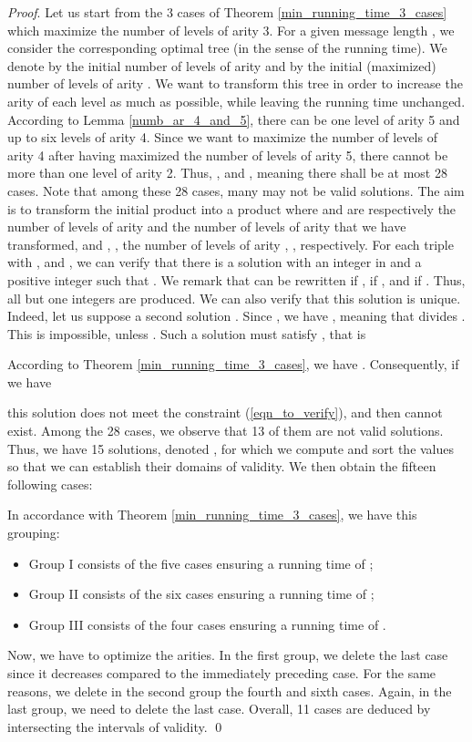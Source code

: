 \documentclass{llncs}
\renewenvironment{proof}{\paragraph{Proof} }{\hfill\qed}
\renewcommand{\paragraph}[1]{\noindent\textit{#1}.}
\begin{document}
\begin{proof}
Let us start from the 3 cases of Theorem \ref{min_running_time_3_cases} which maximize the number of levels of arity 3. 
For a given message length , we consider the corresponding optimal tree (in the sense of the running time). 
We denote by  the initial number of levels of arity  and by  the initial (maximized) number of levels of arity . 
We want to transform this tree in order to increase the arity of each level as much as possible, while leaving the running time unchanged.
According to Lemma \ref{numb_ar_4_and_5}, there can be one level of arity 5 and up to six levels of arity 4.
Since we want to maximize the number of levels of arity 4 after having maximized the number of levels of arity 5, 
there cannot be more than one level of arity 2. Thus, ,  
and , meaning there shall be at most 28 cases.
Note that among these 28 cases, many may not be valid solutions.
The aim is to transform the initial product  into
a product  where  and  are respectively the number of levels of arity  and the number of levels of arity  
that we have transformed, and , ,  the number of levels of arity ,
,  respectively.
For each triple  with ,  
and , we can verify that there is a solution  with  an integer in 
and  a positive integer such that . We remark that  can be rewritten  if ,  if , and  if . 
Thus, all but one integers are produced.
We can also verify that this solution is unique. Indeed, let us suppose a second solution . Since , we have
, meaning that  divides . This is impossible, unless . Such a solution must satisfy  , 
that is

According to Theorem \ref{min_running_time_3_cases}, we have . Consequently, if we have 


this solution does not meet the constraint (\ref{eqn_to_verify}), and then cannot exist. Among the 28 cases, we observe that 13 of them are not valid solutions.
Thus, we have 15 solutions, denoted , for which we compute and sort the values  so that we can establish
their domains of validity. We then obtain the fifteen following cases:



In accordance with Theorem \ref{min_running_time_3_cases}, we have this grouping: 
\begin{itemize}
 \item Group I consists of the five cases ensuring a running time of ;
 \item Group II consists of the six cases ensuring a running time of ;
 \item Group III consists of the four cases ensuring a running time of .
\end{itemize}
Now, we have to optimize the arities. In the first group, we delete the last case since it decreases  compared to the immediately preceding case. 
For the same reasons, we delete in the second group the fourth and sixth cases. Again, in the last group, we need to delete the last case. Overall, 11 cases are deduced
by intersecting the intervals of validity.
\end{proof}
\end{document}

